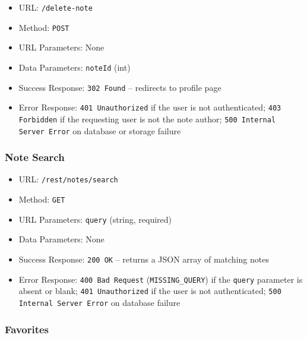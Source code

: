 \begin{itemize}
    \item URL: \texttt{/delete-note}
    \item Method: \texttt{POST}
    \item URL Parameters: None
    \item Data Parameters: \texttt{noteId} (int)
    \item Success Response: \texttt{302 Found} -- redirects to profile page
    \item Error Response: \texttt{401 Unauthorized} if the user is not authenticated; \texttt{403 Forbidden} if the requesting user is not the note author; \texttt{500 Internal Server Error} on database or storage failure
\end{itemize}

\subsubsection*{Note Search}

\begin{itemize}
    \item URL: \texttt{/rest/notes/search}
    \item Method: \texttt{GET}
    \item URL Parameters: \texttt{query} (string, required)
    \item Data Parameters: None
    \item Success Response: \texttt{200 OK} -- returns a JSON array of matching notes
    \item Error Response: \texttt{400 Bad Request} (\texttt{MISSING\_QUERY}) if the \texttt{query} parameter is absent or blank; \texttt{401 Unauthorized} if the user is not authenticated; \texttt{500 Internal Server Error} on database failure
\end{itemize}

\subsubsection*{Favorites}

